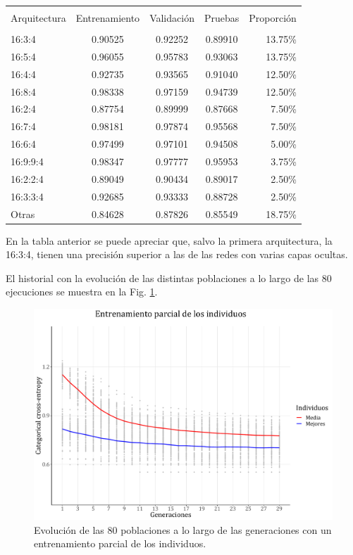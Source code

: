 \documentclass[spanish,a4paper,12pt,twoside]{report}
\begin{document}
\begin{center}
   \label{table}
  \begin{tabular}{l c c c r}
    \hline \\ [-2ex]
    Arquitectura & Entrenamiento & Validación & Pruebas & Proporción \\ [0.5ex]
    \hline \\ [-1ex]
    16:3:4 & 0.90525 & 0.92252 & 0.89910 & 13.75\% \\
    16:5:4 & 0.96055 & 0.95783 & 0.93063 & 13.75\% \\
    16:4:4 & 0.92735 & 0.93565 & 0.91040 & 12.50\% \\
    16:8:4 & 0.98338 & 0.97159 & 0.94739 & 12.50\% \\
    16:2:4 & 0.87754 & 0.89999 & 0.87668 & 7.50\% \\
    16:7:4 & 0.98181 & 0.97874 & 0.95568 & 7.50\% \\
    16:6:4 & 0.97499 & 0.97101 & 0.94508 & 5.00\% \\
    16:9:9:4 & 0.98347 & 0.97777 & 0.95953 & 3.75\% \\
    16:2:2:4 & 0.89049 & 0.90434 & 0.89017 & 2.50\% \\
    16:3:3:4 & 0.92685 & 0.93333 & 0.88728 & 2.50\% \\
    Otras & 0.84628 & 0.87826 & 0.85549 & 18.75\% \\ [1ex]
    \hline
  \end{tabular}
\end{center} \par
  En la tabla anterior se puede apreciar que, salvo la primera arquitectura, la 16:3:4, tienen una precisión superior a las de las redes con varias capas ocultas. \par
  El historial con la evolución de las distintas poblaciones a lo largo de las 80 ejecuciones se muestra en la Fig. \ref{fig:22}. \par
  \begin{figure}[H]
    \centering
    \includegraphics[width = 1\textwidth]{resources/Fig22.pdf}
    \caption{Evolución de las 80 poblaciones a lo largo de las generaciones con un entrenamiento parcial de los individuos.}
    \label{fig:22}
  \end{figure} \vfill
\end{document}
